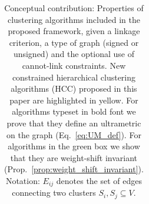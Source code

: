 \begin{table}[t]
\begin{subtable}[t!]{\textwidth}
\begin{tabular}{l |c  c  c  c  c}
            
             


             





        \end{tabular}
    \end{subtable} 
    \caption{Conceptual contribution: Properties of clustering algorithms included in the proposed \algname{} framework, given a linkage criterion, a type of graph (signed or unsigned) and the optional use of cannot-link constraints. New constrained hierarchical clustering algorithms (HCC) proposed in this paper are highlighted in yellow. For algorithms typeset in bold font we prove that they define an ultrametric on the graph (Eq.~\ref{eq:UM_def}). For algorithms in the green box we show that they are weight-shift invariant (Prop.~\ref{prop:weight_shift_invariant}). 
    Notation: 
    $E_{ij}$ denotes the set of edges connecting two clusters $S_i, S_j \subseteq V$. } 
    \label{tab:linkage-criteria}
\end{table}



